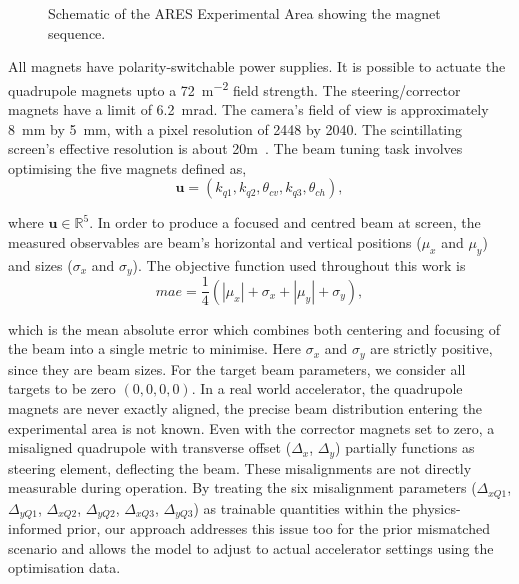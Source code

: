 \begin{figure}[ht]
\caption{Schematic of the ARES Experimental Area showing the magnet sequence.}
\label{fig:ares_lattice}
\end{figure}


All magnets have polarity-switchable power supplies. It is possible to actuate the quadrupole magnets 
upto a \SI{72}{m^{-2}} field strength. The steering/corrector magnets have a limit of \SI{6.2}{mrad}. The camera's field of view is approximately \SI{8}{mm} by \SI{5}{mm}, with a pixel resolution of 2448 by 2040. The scintillating screen's effective resolution is about \SI{20}{\mu}m~\cite{kaiser2024rl}. 
The beam tuning task involves optimising the five magnets defined as,
\begin{equation}
    \label{eq_magnets}
    \mathbf{u} = (k_{q1}, k_{q2}, \theta_{cv}, k_{q3}, \theta_{ch}),
\end{equation}

where $\mathbf{u} \in \mathbb{R}^5$. In order to produce a focused and centred beam at screen, the measured observables are beam’s 
horizontal and vertical positions ($\mu_x$ and $\mu_y$) and sizes ($\sigma_x$ and $\sigma_y$). The objective 
function used throughout this work is
\begin{equation}
    \label{eq_ares_ob}
    mae = \frac{1}{4}(|\mu_x| + \sigma_x + |\mu_y| + \sigma_y),
\end{equation}

which is the mean absolute error which combines both centering and 
focusing of the beam into a single metric to minimise. Here $\sigma_x$ and $\sigma_y$ are strictly positive, since they are beam sizes. For the target beam parameters, we consider all targets to be zero $(0,0,0,0)$. In a real world accelerator, the quadrupole magnets are never exactly aligned, 
the precise beam distribution entering the experimental area is not known. Even with the corrector magnets set to zero, 
a misaligned quadrupole with transverse offset ($\Delta_x$, $\Delta_y$) partially functions as steering element,
deflecting the beam. These misalignments are not directly measurable during operation. By treating the six misalignment parameters ($\Delta_{xQ1}$, $\Delta_{yQ1}$, $\Delta_{xQ2}$, $\Delta_{yQ2}$, $\Delta_{xQ3}$, $\Delta_{yQ3}$) 
as trainable quantities within the physics-informed prior, our approach addresses this issue too for the prior mismatched scenario
and allows the model to adjust to actual accelerator settings using the optimisation data. 




